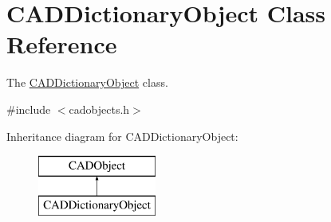 \hypertarget{class_c_a_d_dictionary_object}{}\section{C\+A\+D\+Dictionary\+Object Class Reference}
\label{class_c_a_d_dictionary_object}


The \hyperlink{class_c_a_d_dictionary_object}{C\+A\+D\+Dictionary\+Object} class.  




{\ttfamily \#include $<$cadobjects.\+h$>$}

Inheritance diagram for C\+A\+D\+Dictionary\+Object\+:\begin{figure}[H]
\begin{center}
\leavevmode
\includegraphics[height=2.000000cm]{class_c_a_d_dictionary_object}
\end{center}
\end{figure}
